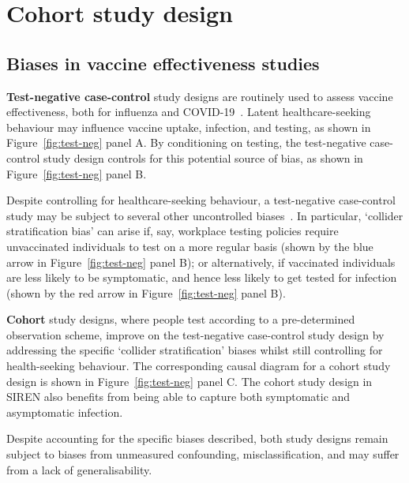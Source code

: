 \section{Cohort study design}\label{sec:cohort-study-design}

\subsection{Biases in vaccine effectiveness studies}

\textbf{Test-negative case-control} study designs are routinely used to assess vaccine effectiveness, both for influenza and COVID-19~\parencite{Andrews2022-qd, Dean2021-qw, Lopez_Bernal2021-gt}. Latent healthcare-seeking behaviour may influence vaccine uptake, infection, and testing, as shown in Figure~\ref{fig:test-neg} panel A. By conditioning on testing, the test-negative case-control study design controls for this potential source of bias, as shown in Figure~\ref{fig:test-neg} panel B.

Despite controlling for healthcare-seeking behaviour, a test-negative case-control study may be subject to several other uncontrolled biases~\parencite{Shi2023-ic, Sullivan2016-io}. In particular, `collider stratification bias' can arise if, say, workplace testing policies require unvaccinated individuals to test on a more regular basis (shown by the blue arrow in Figure~\ref{fig:test-neg} panel B); or alternatively, if vaccinated individuals are less likely to be symptomatic, and hence less likely to get tested for infection (shown by the red arrow in Figure~\ref{fig:test-neg} panel B).

\textbf{Cohort} study designs, where people test according to a pre-determined observation scheme, improve on the test-negative case-control study design by addressing the specific `collider stratification' biases whilst still controlling for health-seeking behaviour. The corresponding causal diagram for a cohort study design is shown in Figure~\ref{fig:test-neg} panel C. The cohort study design in SIREN also benefits from being able to capture both symptomatic and asymptomatic infection.

Despite accounting for the specific biases described, both study designs remain subject to biases from unmeasured confounding, misclassification, and may suffer from a lack of generalisability.

